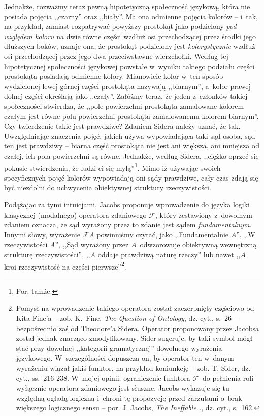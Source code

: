 Jednakże, rozważmy teraz pewną hipotetyczną społeczność językową, która nie posiada pojęcia ,,czarny'' oraz ,,biały''. Ma ona odmienne pojęcia kolorów -- i~tak, na przykład, zamiast rozpatrywać powyższy prostokąt jako podzielony \textit{pod względem koloru} na dwie równe części wzdłuż osi przechodzącej przez środki jego dłuższych boków, uznaje ona, że prostokąt podzielony jest \textit{kolorystycznie} wzdłuż osi przechodzącej przez jego dwa przeciwstawne wierzchołki. Według tej hipotetycznej społeczności językowej powstałe w~wyniku takiego podziału części prostokąta posiadają odmienne kolory. Mianowicie kolor w~ten sposób wydzielonej lewej górnej części prostokąta nazywają ,,biarnym'', a~kolor prawej dolnej części określają jako ,,czały''. Załóżmy teraz, że jeden z~członków takiej społeczności stwierdza, że ,,pole powierzchni prostokąta zamalowane kolorem czałym jest równe polu powierzchni prostokąta zamalowanemu kolorem biarnym''. Czy twierdzenie takie jest prawdziwe? Zdaniem Sidera należy uznać, że tak. Uwzględniając znaczenia pojęć, jakich używa wypowiadająca taki sąd osoba, sąd ten jest prawdziwy -- biarna część prostokąta nie jest ani większa, ani mniejsza od czałej, ich pola powierzchni są równe. Jednakże, według Sidera, ,,ciężko oprzeć się pokusie stwierdzenia, że ludzi ci się mylą''\footnote{Por. tamże.}. Mimo iż używając swoich specyficznych pojęć kolorów wypowiadają oni sądy prawdziwe, cały czas zdają się być niezdolni do uchwycenia obiektywnej struktury rzeczywistości.

Podążając za tymi intuicjami, Jacobs proponuje wprowadzenie do języka logiki klasycznej (modalnego) operatora zdaniowego $\mathscr{F}$, który zestawiony z~dowolnym zdaniem oznacza, że sąd wyrażony przez to zdanie jest sądem \textit{fundamentalnym}. Innymi słowy, wyrażenie $\mathscr{F}A$ powinniśmy czytać, jako ,,Fundamentalnie $A$'', ,,W rzeczywistości $A$'', ,,Sąd wyrażony przez $A$~odwzorowuje obiektywną wewnętrzną strukturę rzeczywistości'', ,,$A$ oddaje prawdziwą naturę rzeczy'' lub nawet ,,$A$ kroi rzeczywistość na części pierwsze''\footnote{Pomysł na wprowadzenie takiego operatora został zaczerpnięty częściowo od Kita Fine'a -- zob. K.~Fine, \textit{The Question of Ontology}, dz. cyt., s.~26 -- bezpośrednio zaś od Theodore'a Sidera. Operator proponowany przez Jacobsa został jednak znacząco zmodyfikowany. Sider sugeruje, by taki symbol mógł stać przy dowolnej ,,kategorii gramatycznej'' dowolnego wyrażenia językowego. W~szczególności dopuszcza on, by operator ten w~danym wyrażeniu wiązał jakiś funktor, na przykład koniunkcję -- zob. T. Sider, dz. cyt., ss.~216-238. W~mojej opinii, ograniczenie funktora $\mathscr{F}$~do pełnienia roli wyłącznie operatora zdaniowego jest słuszne. Jacobs wykazuje się tu względną ogładą logiczną i~chroni tę propozycję przed zarzutami o~brak większego logicznego sensu -- por. J. Jacobs, \textit{The Ineffable}\ldots, dz. cyt., s.~162.}.

